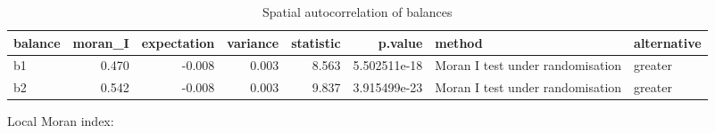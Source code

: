 \documentclass[
  12pt,
]{article}
\begin{document}
\begin{table}

\caption{\label{tab:prsh-CoDa-moran-global}Spatial autocorrelation of balances}
\centering
\begin{tabular}[t]{l|r|r|r|r|r|l|l}
\hline
balance & moran\_I & expectation & variance & statistic & p.value & method & alternative\\
\hline
b1 & 0.470 & -0.008 & 0.003 & 8.563 & 5.502511e-18 & Moran I test under randomisation & greater\\
\hline
b2 & 0.542 & -0.008 & 0.003 & 9.837 & 3.915499e-23 & Moran I test under randomisation & greater\\
\hline
\end{tabular}
\end{table}

Local Moran index:
\end{document}

